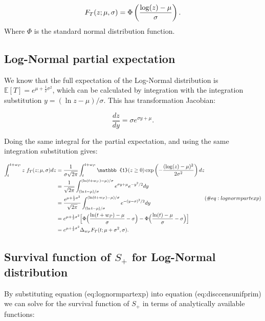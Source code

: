 \documentclass[10pt,letterpaper]{article}
\begin{document}
\begin{equation}
F_T(z;\mu, \sigma) = \Phi\left( {\log(z) - \mu \over \sigma} \right).
\end{equation}
Where $\Phi$ is the standard normal distribution function.

\subsection{Log-Normal partial expectation}

We know that the full expectation of the Log-Normal distribution is $\mathbb{E}[T] = e^{\mu + \frac{1}{2} \sigma^2}$, which can be calculated by integration with the integration substitution $y = (\ln z - \mu) / \sigma$. This has transformation Jacobian:

\begin{equation}
\frac{dz}{dy} = \sigma e^{\sigma y + \mu}.
\end{equation}

Doing the same integral for the partial expectation, and using the same integration substitution gives:

\begin{equation}
\begin{aligned}
\int_t^{t+w_P} z~ f_T(z; \mu, \sigma) dz &= {1 \over \sigma \sqrt{2\pi}} \int_t^{t+w_P}  \mathbb{1}(z \geq 0)  \exp\left( - {(\log(z) - \mu)^2 \over 2 \sigma^2} \right) dz \\
&= {1 \over \sqrt{2\pi}} \int_{(\ln t - \mu)/\sigma}^{(\ln(t+w_P) - \mu)/\sigma} e^{\sigma y + \mu} e^{-y^2/2} dy\\
&= {e^{\mu + \frac{1}{2} \sigma^2} \over \sqrt{2 \pi} } \int_{(\ln t - \mu)/\sigma}^{(\ln(t+w_P) - \mu)/\sigma} e^{-(y- \sigma)^2/2} dy \\
&= e^{\mu + \frac{1}{2} \sigma^2} \Big[\Phi\Big({\ln(t+w_P) - \mu \over \sigma} - \sigma\Big) - \Phi\Big({\ln(t) - \mu \over \sigma} - \sigma\Big) \Big]\\
&= e^{\mu + \frac{1}{2} \sigma^2} \Delta_{w_P}F_T(t; \mu + \sigma^2, \sigma).
\end{aligned} (\#eq:lognormpartexp)
\end{equation}

\subsection{Survival function of $S_{+}$ for Log-Normal distribution}

By substituting equation \@ref(eq:lognormpartexp) into equation \@ref(eq:disccensunifprim) we can solve for the survival function of $S_+$ in terms of analytically available functions:
\end{document}
